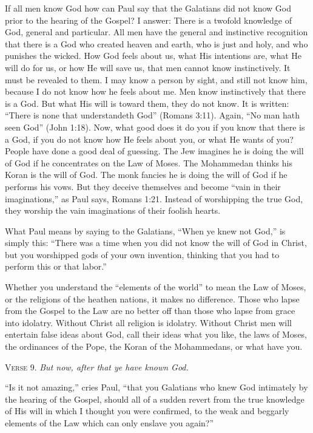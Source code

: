 If all men know God how can Paul say that the Galatians did not know God prior to the hearing of the Gospel? I answer: There is a twofold knowledge of God, general and particular. All men have the general and instinctive recognition that there is a God who created heaven and earth, who is just and holy, and who punishes the wicked. How God feels about us, what His intentions are, what He will do for us, or how He will save us, that men cannot know instinctively. It must be revealed to them. I may know a person by sight, and still not know him, because I do not know how he feels about me. Men know instinctively that there is a God. But what His will is toward them, they do not know. It is written: “There is none that understandeth God” (Romans 3:11). Again, “No man hath seen God” (John 1:18). Now, what good does it do you if you know that there is a God, if you do not know how He feels about you, or what He wants of you? People have done a good deal of guessing. The Jew imagines he is doing the will of God if he concentrates on the Law of Moses. The Mohammedan thinks his Koran is the will of God. The monk fancies he is doing the will of God if he performs his vows. But they deceive themselves and become “vain in their imaginations,” as Paul says, Romans 1:21. Instead of worshipping the true God, they worship the vain imaginations of their foolish hearts.

What Paul means by saying to the Galatians, “When ye knew not God,” is simply this: “There was a time when you did not know the will of God in Christ, but you worshipped gods of your own invention, thinking that you had to perform this or that labor.”

Whether you understand the “elements of the world” to mean the Law of Moses, or the religions of the heathen nations, it makes no difference. Those who lapse from the Gospel to the Law are no better off than those who lapse from grace into idolatry. Without Christ all religion is idolatry. Without Christ men will entertain false ideas about God, call their ideas what you like, the laws of Moses, the ordinances of the Pope, the Koran of the Mohammedans, or what have you.

\textsc{Verse} 9. \emph{But now, after that ye have known God.}

“Is it not amazing,” cries Paul, “that you Galatians who knew God intimately by the hearing of the Gospel, should all of a sudden revert from the true knowledge of His will in which I thought you were confirmed, to the weak and beggarly elements of the Law which can only enslave you again?”


